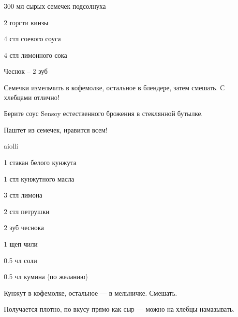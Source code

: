 \newpage
{}
{}
\titleZD
\newpage


\makeatletter
{}
\makeatother

{\label{aiolli}
\item 300 мл сырых семечек подсолнуха
\item 2 горсти кинзы 
\item 4 стл соевого соуса
\item 4 стл лимонного сока
}{
\item Чеснок – 2 зуб
}{
Семечки измельчить в кофемолке, остальное в блендере, затем смешать. С хлебцами отлично!
}{
\begin{advice}
\item Берите соус Sensoy естественного брожения в стеклянной бутылке.
\item Паштет из семечек, нравится всем!
\end{advice}}{aiolli}



{\label{takini}
\item 1 стакан белого кунжута 
\item 1 стл кунжутного масла
\item 3 стл лимона
\item 2 стл петрушки
}{
\item 2 зуб чеснока
\item 1 щеп чили
\item 0.5 чл соли
\item 0.5 чл кумина (по желанию)
}{
Кунжут в кофемолке, остальное — в мельничке. Смешать. 
}{
\begin{advice}
\item Получается плотно, по вкусу прямо как сыр — можно на хлебцы намазывать.
\end{advice}}{}



